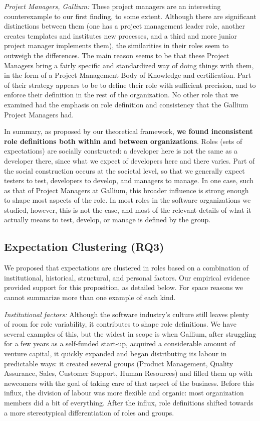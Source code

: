 \documentclass[10pt, conference, compsocconf]{IEEEtran}
\begin{document}
\emph{Project Managers, Gallium:} These project managers are an interesting counterexample to our first finding, to some extent. Although there are significant distinctions between them (one has a project management leader role, another creates templates and institutes new processes, and a third and more junior project manager implements them), the similarities in their roles seem to outweigh the differences. The main reason seems to be that these Project Managers bring a fairly specific and standardized way of doing things with them, in the form of a Project Management Body of Knowledge and certification. Part of their strategy appears to be to define their role with sufficient precision, and to enforce their definition in the rest of the organization. No other role that we examined had the emphasis on role definition and consistency that the Gallium Project Managers had.

In summary, as proposed by our theoretical framework, \textbf{we found inconsistent role definitions both within and between organizations}. Roles (sets of expectations) are socially constructed: a developer here is not the same as a developer there, since what we expect of developers here and there varies. Part of the social construction occurs at the societal level, so that we generally expect testers to test, developers to develop, and managers to manage. In one case, such as that of Project Managers at Gallium, this broader influence is strong enough to shape most aspects of the role. In most roles in the software organizations we studied, however, this is not the case, and most of the relevant details of what it actually means to test, develop, or manage is defined by the group.


\subsection{Expectation Clustering (RQ3)}

We proposed that expectations are clustered in roles based on a combination of institutional, historical, structural, and personal factors. Our empirical evidence provided support for this proposition, as detailed below. For space reasons we cannot summarize more than one example of each kind.

\emph{Institutional factors:} Although the software industry's culture still leaves plenty of room for role variability, it contributes to shape role definitions. We have several examples of this, but the widest in scope is when Gallium, after struggling for a few years as a self-funded start-up, acquired a considerable amount of venture capital, it quickly expanded and began distributing its labour in predictable ways: it created several groups (Product Management, Quality Assurance, Sales, Customer Support, Human Resources) and filled them up with newcomers with the goal of taking care of that aspect of the business. Before this influx, the division of labour was more flexible and organic: most organization members did a bit of everything. After the influx, role definitions shifted towards a more stereotypical differentiation of roles and groups.
\end{document}
